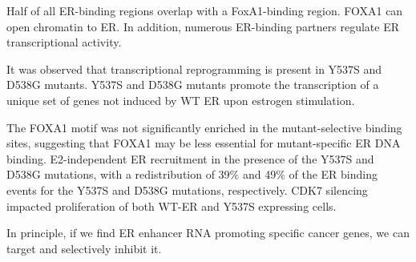Half of all ER-binding regions overlap with a FoxA1-binding region. FOXA1 can open chromatin to ER. In addition, numerous ER-binding partners regulate ER transcriptional activity.

It was observed that transcriptional reprogramming is present in Y537S and D538G mutants. Y537S and D538G mutants promote the transcription of a unique set of genes not induced by WT ER upon estrogen stimulation.

The FOXA1 motif was not significantly enriched in the mutant-selective binding sites, suggesting that FOXA1 may be less essential for mutant-specific ER DNA binding. E2-independent ER recruitment in the presence of the Y537S and D538G mutations, with a redistribution of 39\% and 49\% of the ER binding events for the Y537S and D538G mutations, respectively. CDK7 silencing impacted proliferation of both WT-ER and Y537S expressing cells.

In principle, if we find ER enhancer RNA promoting specific cancer genes, we can target and selectively inhibit it.

